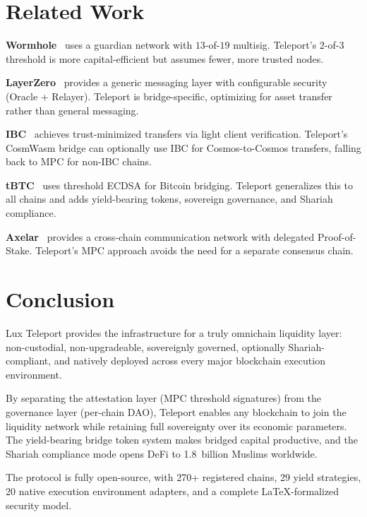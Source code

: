 \documentclass[11pt,twocolumn]{article}
\begin{document}
\section{Related Work}

\textbf{Wormhole}~\cite{wormhole} uses a guardian network with $13$-of-$19$ multisig. Teleport's $2$-of-$3$ threshold is more capital-efficient but assumes fewer, more trusted nodes.

\textbf{LayerZero}~\cite{layerzero} provides a generic messaging layer with configurable security (Oracle + Relayer). Teleport is bridge-specific, optimizing for asset transfer rather than general messaging.

\textbf{IBC}~\cite{ibc} achieves trust-minimized transfers via light client verification. Teleport's CosmWasm bridge can optionally use IBC for Cosmos-to-Cosmos transfers, falling back to MPC for non-IBC chains.

\textbf{tBTC}~\cite{tbtc} uses threshold ECDSA for Bitcoin bridging. Teleport generalizes this to all chains and adds yield-bearing tokens, sovereign governance, and Shariah compliance.

\textbf{Axelar}~\cite{axelar} provides a cross-chain communication network with delegated Proof-of-Stake. Teleport's MPC approach avoids the need for a separate consensus chain.

\section{Conclusion}

Lux Teleport provides the infrastructure for a truly omnichain liquidity layer: non-custodial, non-upgradeable, sovereignly governed, optionally Shariah-compliant, and natively deployed across every major blockchain execution environment.

By separating the attestation layer (MPC threshold signatures) from the governance layer (per-chain DAO), Teleport enables any blockchain to join the liquidity network while retaining full sovereignty over its economic parameters. The yield-bearing bridge token system makes bridged capital productive, and the Shariah compliance mode opens DeFi to 1.8~billion Muslims worldwide.

The protocol is fully open-source, with 270+ registered chains, 29 yield strategies, 20 native execution environment adapters, and a complete LaTeX-formalized security model.
\end{document}
